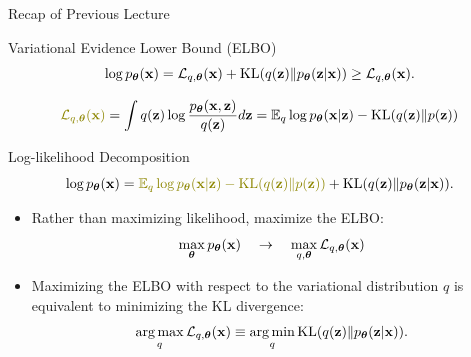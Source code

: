 \documentclass{beamer}
\begin{document}
\begin{frame}{Recap of Previous Lecture}
	\begin{block}{Variational Evidence Lower Bound (ELBO)}
		\vspace{-0.3cm}
		\[
			\log p_{\boldsymbol{\theta}}(\mathbf{x}) = \mathcal{L}_{q, \boldsymbol{\theta}}(\mathbf{x}) + \mathrm{KL}(q(\mathbf{z}) \| p_{\boldsymbol{\theta}}(\mathbf{z}|\mathbf{x})) \geq \mathcal{L}_{q, \boldsymbol{\theta}}(\mathbf{x}).
		\]
	\end{block}

	\vspace{-0.5cm}
	\[
	 	{\color{olive}\cL_{q, \btheta}(\bx)} = \int q(\bz) \log \frac{\pt(\bx, \bz)}{q(\bz)}d\bz = \bbE_{q} \log \pt(\bx | \bz) - \KL (q(\bz) \| p(\bz))
	\]
	\vspace{-0.3cm}
	\begin{block}{Log-likelihood Decomposition}
		\vspace{-0.5cm}
		\[
	 		\log \pt(\bx) = {\color{olive}\bbE_{q} \log \pt(\bx | \bz) - \KL (q(\bz) \| p(\bz))} + \KL(q(\bz) \| \pt(\bz|\bx)).
		\]
	\end{block}
	\begin{itemize}
		\item Rather than maximizing likelihood, maximize the ELBO:
		\[
			\max_{\boldsymbol{\theta}} p_{\boldsymbol{\theta}}(\mathbf{x}) \quad \rightarrow \quad \max_{q, \boldsymbol{\theta}} \mathcal{L}_{q, \boldsymbol{\theta}}(\mathbf{x})
		\]
		\item Maximizing the ELBO with respect to the variational distribution $q$ is equivalent to minimizing the KL divergence:
		\[
			\operatorname*{arg\,max}_q \mathcal{L}_{q, \boldsymbol{\theta}}(\mathbf{x}) \equiv \operatorname*{arg\,min}_q \mathrm{KL}(q(\mathbf{z}) \| p_{\boldsymbol{\theta}}(\mathbf{z}|\mathbf{x})).
		\]
  	\end{itemize}
\end{frame}
\end{document}

